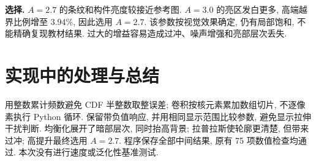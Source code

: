 \documentclass[UTF8,a4paper,zihao=5,fontset=fandol]{ctexart}
\begin{document}
\textbf{选择.} $A=2.7$ 的条纹和构件亮度较接近参考图.
$A=3.0$ 的亮区发白更多, 高端越界比例增至 3.94\%, 因此选用 $A=2.7$.
该参数按视觉效果确定, 仍有局部饱和, 不能精确复现教材结果.
过大的增益容易造成过冲、噪声增强和亮部层次丢失.

\section{实现中的处理与总结}
用整数累计频数避免 CDF 半整数取整误差; 卷积按核元素累加数组切片,
不逐像素执行 Python 循环. 保留带负值响应, 并用相同显示范围比较参数, 避免显示拉伸干扰判断.
均衡化展开了暗部层次, 同时抬高背景; 拉普拉斯使轮廓更清楚, 但带来过冲;
高提升最终选用 $A=2.7$. 程序保存全部中间结果, 原有 75 项数值检查均通过.
本次没有进行速度或泛化性基准测试.

\vspace{2pt}
\end{document}
